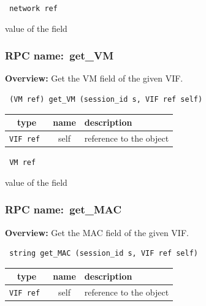 \vspace{0.3cm}

{\tt 
network ref
}


value of the field
\vspace{0.3cm}
\vspace{0.3cm}
\vspace{0.3cm}
\subsubsection{RPC name:~get\_VM}

{\bf Overview:} 
Get the VM field of the given VIF.

\begin{verbatim} (VM ref) get_VM (session_id s, VIF ref self)\end{verbatim}



 
\vspace{0.3cm}
\begin{tabular}{|c|c|p{7cm}|}
 \hline
{\bf type} & {\bf name} & {\bf description} \\ \hline
{\tt VIF ref } & self & reference to the object \\ \hline 

\end{tabular}

\vspace{0.3cm}

{\tt 
VM ref
}


value of the field
\vspace{0.3cm}
\vspace{0.3cm}
\vspace{0.3cm}
\subsubsection{RPC name:~get\_MAC}

{\bf Overview:} 
Get the MAC field of the given VIF.

\begin{verbatim} string get_MAC (session_id s, VIF ref self)\end{verbatim}



 
\vspace{0.3cm}
\begin{tabular}{|c|c|p{7cm}|}
 \hline
{\bf type} & {\bf name} & {\bf description} \\ \hline
{\tt VIF ref } & self & reference to the object \\ \hline 

\end{tabular}


